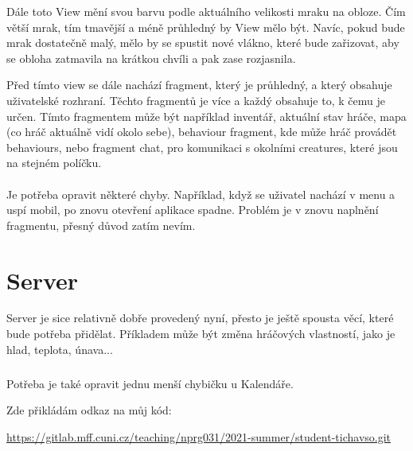 \documentclass[12pt,a4paper]{report}
\begin{document}
Dále toto View mění svou barvu podle aktuálního velikosti mraku na obloze. Čím větší mrak, tím tmavější a méně průhledný by View mělo být. Navíc, pokud bude mrak dostatečně malý, mělo by se spustit nové vlákno, které bude zařizovat, aby se obloha zatmavila na krátkou chvíli a pak zase rozjasnila. 

Před tímto view se dále nachází fragment, který je průhledný, a který obsahuje uživatelské rozhraní. Těchto fragmentů je více a každý obsahuje to, k čemu je určen. Tímto fragmentem může být například inventář, aktuální stav hráče, mapa (co hráč aktuálně vidí okolo sebe), behaviour fragment, kde může hráč provádět behaviours, nebo fragment chat, pro komunikaci s okolními creatures, které jsou na stejném políčku.

\paragraph{}
Je potřeba opravit některé chyby. Například, když se uživatel nachází v menu a uspí mobil, po znovu otevření aplikace spadne. Problém je v znovu naplnění fragmentu, přesný důvod zatím nevím.

\section{Server}

Server je sice relativně dobře provedený nyní, přesto je ještě spousta věcí, které bude potřeba přidělat. Příkladem může být změna hráčových vlastností, jako je hlad, teplota, únava...

\subparagraph{}
Potřeba je také opravit jednu menší chybičku u Kalendáře.

Zde přikládám odkaz na můj kód:

\url{https://gitlab.mff.cuni.cz/teaching/nprg031/2021-summer/student-tichavso.git}

\openright
\end{document}

